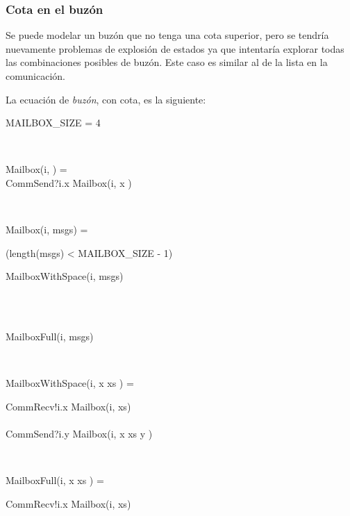 \subsubsection*{Cota en el buzón}

Se puede modelar un buzón que no tenga una cota superior, pero se tendría nuevamente problemas de explosión de estados ya que \FDR intentaría explorar todas las combinaciones posibles de buzón. Este caso es similar al de la lista en la comunicación. 

La ecuación de \textit{buzón}, con cota, es la siguiente:

\begin{process}

\begin{block}
MAILBOX\_SIZE = 4
\end{block} \\

\begin{block}
Mailbox(i, \nil) = {} \\ \quad
CommSend?i.x \then Mailbox(i, \lseq x \rseq) 
\end{block} \\

\begin{block}
Mailbox(i, msgs) = {} \\ \quad
  \begin{block} 
  \If (length(msgs) < MAILBOX\_SIZE - 1) \Then {} \\ \quad
    \begin{block} 
      MailboxWithSpace(i, msgs)
    \end{block} \\
  \Else {} \\ \quad
    \begin{block}
      MailboxFull(i, msgs)
    \end{block}
  \end{block} 
\end{block} \\

\begin{block}
MailboxWithSpace(i, \lseq x \rseq \cat xs ) = {} \\ \quad 
  \begin{block}
    CommRecv!i.x \then Mailbox(i, xs) \\
    \Extchoice \\
    CommSend?i.y \then Mailbox(i, \lseq x \rseq \cat xs \cat \lseq y \rseq ) 
  \end{block}
\end{block} \\

\begin{block}
MailboxFull(i, \lseq x \rseq \cat xs ) = {} \\ \quad 
  \begin{block}
    CommRecv!i.x \then Mailbox(i, xs) \\
  \end{block}
\end{block} \\
\end{process}

